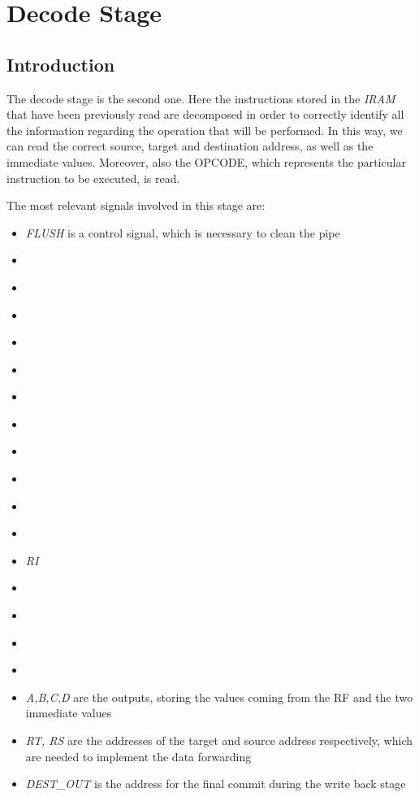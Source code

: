 \section{Decode Stage}
\label{chap_dec}

\subsection{Introduction}
The decode stage is the second one. Here the instructions stored in the \textit{IRAM} that have been previously read are decomposed in order to correctly identify all the information regarding the operation that will be performed. In this way, we can read the correct source, target and destination address, as well as the immediate values. Moreover, also the \textsf{OPCODE}, which represents the particular instruction to be executed, is read.

The most relevant signals involved in this stage are:
\begin{itemize}
	\item \textit{FLUSH} is a control signal, which is necessary to clean the pipe
	\item \textit{}
	\item \textit{}
	\item \textit{}
	\item \textit{}
	\item \textit{}
	\item \textit{}
	\item \textit{}
	\item \textit{}
	\item \textit{}
	\item \textit{}
	\item \textit{}
	\item \textit{RI}
	\item \textit{}
	\item \textit{}
	\item \textit{}
	\item \textit{}
	\item \textit{A,B,C,D} are the outputs, storing the values coming from the \textsf{RF} and the two immediate values
	\item \textit{RT, RS} are the addresses of the target and source address respectively, which are needed to implement the data forwarding
	\item \textit{DEST\_OUT} is the address for the final commit during the write back stage
\end{itemize}

